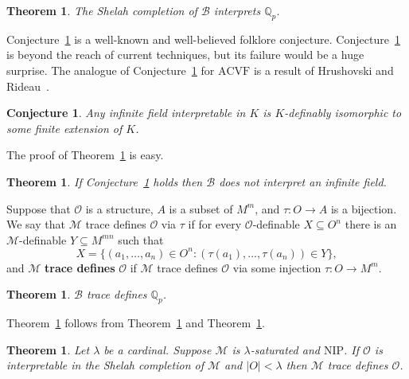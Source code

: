 \documentclass[bibalpha]{amsart}
\newtheorem{thm}[theorem]{Theorem}
\newtheorem{conj}{Conjecture}
\theoremstyle{definition}
\theoremstyle{remark}
\newcommand{\sub}{\subseteq}
\newcommand{\nip}{\mathrm{NIP}}
\newcommand{\Sa}[1]{\ensuremath{\mathscr{#1}}}
\newcommand{\Q}{\mathbb{Q}}
\begin{document}
\begin{thm}
\label{thm:2}
The Shelah completion of $\Sa B$ interprets $\Q_p$.
\end{thm}


\noindent
Conjecture~\ref{conj:obv} is a well-known and well-believed folklore conjecture.
Conjecture~\ref{conj:obv} is beyond the reach of current techniques, but its failure would be a huge surprise.
The analogue of Conjecture~\ref{conj:obv} for $\mathrm{ACVF}$ is a result of Hrushovski and Rideau~\cite{metastable}.

\begin{conj}
\label{conj:obv}
Any infinite field interpretable in $K$ is $K$-definably isomorphic to some finite extension of $K$.
\end{conj}

\noindent
The proof of Theorem~\ref{thm:1} is easy.

\begin{thm}
\label{thm:1}
If Conjecture~\ref{conj:obv} holds then $\Sa B$ does not interpret an infinite field.
\end{thm}

\noindent
Suppose that $\Sa O$ is a structure, $A$ is a subset of $M^m$, and $\tau : O \to A$ is a bijection.
We say that $\Sa M$ trace defines $\Sa O$ via $\tau$ if for every $\Sa O$-definable $X \sub O^n$ there is an $\Sa M$-definable $Y \subseteq M^{mn}$ such that 
$$ X = \{ (a_1,\ldots,a_n) \in O^n : (\tau(a_1),\ldots,\tau(a_n)) \in Y \}, $$
and $\Sa M$ \textbf{trace defines} $\Sa O$ if $\Sa M$ trace defines $\Sa O$ via some injection $\tau : O \to M^m$.

\begin{thm}
\label{thm:trace-field}
$\Sa B$ trace defines $\Q_p$.
\end{thm}

\noindent
Theorem~\ref{thm:trace-field} follows from Theorem~\ref{thm:2} and Theorem~\ref{thm:field-ext}.

\begin{thm}
\label{thm:field-ext}
Let $\lambda$ be a cardinal.
Suppose $\Sa M$ is $\lambda$-saturated and $\nip$.
If $\Sa O$ is interpretable in the Shelah completion of $\Sa M$ and $|O| < \lambda$ then $\Sa M$ trace defines $\Sa O$.
\end{thm}
\end{document}
